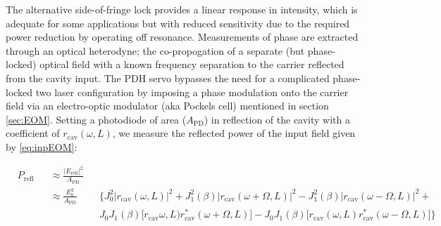 \noindent The alternative side-of-fringe lock provides a linear response in intensity, which is adequate for some applications but with reduced sensitivity due to the required power reduction by operating off resonance. Measurements of phase are extracted through an optical heterodyne; the co-propogation of a separate (but phase-locked) optical field with a known frequency separation to the carrier reflected from the cavity input. The PDH servo bypasses the need for a complicated phase-locked two laser configuration by imposing a phase modulation onto the carrier field via an electro-optic modulator (aka Pockels cell) mentioned in section \autoref{sec:EOM}. Setting a photodiode of area ($A_\mathrm{PD}$) in reflection of the cavity with a coefficient of $r_\mathrm{cav}(\omega,L)$, we measure the reflected power of the input field given by \autoref{eq:inpEOM}\;:


%



\begin{equation}
 \begin{alignedat}{3}
    &P_\mathrm{refl} && \approx \frac{|E_\mathrm{refl}|^2}{A_\mathrm{PD}} && \\
    & &&\approx \frac{E_0^2}{A_\mathrm{PD}} && \bigg\{J_0^2 |r_\mathrm{cav}(\omega,L)|^2 + J_1^2(\beta)|r_\mathrm{cav}(\omega+\Omega,L)|^2 - J_1^2(\beta)|r_\mathrm{cav}(\omega-\Omega,L)|^2 +  \\
    & && && J_0J_1(\beta)\big[r_\mathrm{cav}\omega,L) r_\mathrm{cav}^*(\omega+\Omega,L)\big] - J_ 0J_1(\beta)\big[r_\mathrm{cav}(\omega,L)r_\mathrm{cav}^*(\omega-\Omega,L)\big]\bigg\}
  \end{alignedat}
\end{equation}

